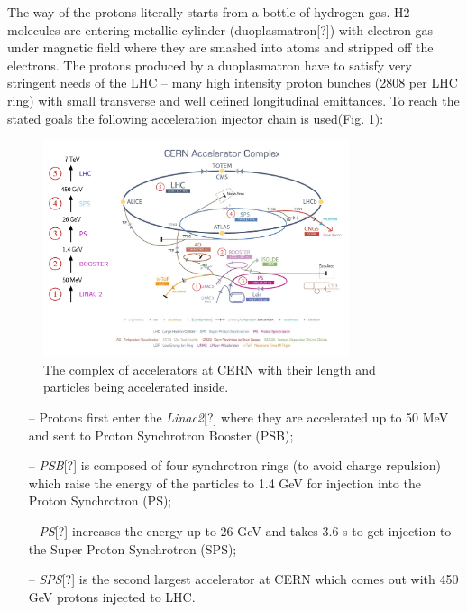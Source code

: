 The way of the protons literally starts from a bottle of hydrogen gas.
H2 molecules are entering metallic cylinder (duoplasmatron[?]) with electron gas under magnetic field  where they are smashed 
into atoms and stripped off the electrons. The protons produced by a duoplasmatron have to satisfy very stringent needs of the LHC -- 
many high intensity proton bunches (2808 per LHC ring) with small transverse and well defined longitudinal emittances.
To reach the stated goals the following acceleration injector chain is used(Fig. \ref{fig:AccelCERN}): 

\begin{figure}[t]
  \centering
  \includegraphics[width=0.8\textwidth]{02_experimental_setup/plots/Cern-Accelerator-Complex-2.png}
  \caption{The complex of accelerators at CERN with their length and particles being accelerated inside.}
  \label{fig:AccelCERN}
\end{figure}

\begin{itemize}
 \item[--] Protons first enter the \textit{Linac2}[?] where they are accelerated up to 50 MeV and sent to Proton Synchrotron Booster (PSB);
 \item[--] \textit{PSB}[?] is composed of four synchrotron rings (to avoid charge repulsion) which raise the energy of the particles to 1.4 GeV
 for injection into the Proton Synchrotron (PS);
 \item[--] \textit{PS}[?] increases the energy up to 26 GeV and takes 3.6 s to get injection to the Super Proton Synchrotron (SPS); 
 \item[--] \textit{SPS}[?] is the second largest accelerator at CERN which comes out with 450 GeV protons injected to LHC.
\end{itemize}

